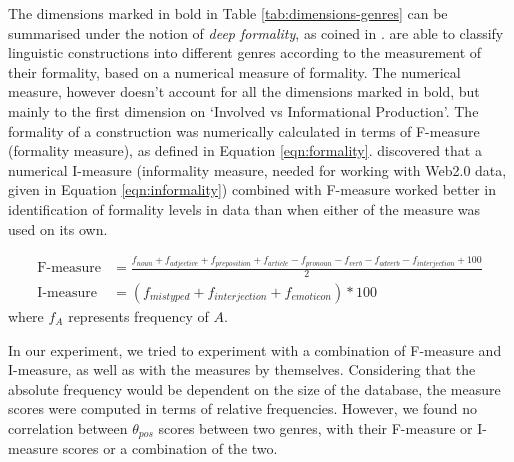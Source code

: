 The dimensions marked in bold in Table \ref{tab:dimensions-genres} can be summarised under the notion of \textit{deep formality}, as coined in \cite{formality1}. \citeauthor{formality1} are able to classify linguistic constructions into different genres according to the measurement of their formality, based on a numerical measure of formality. The numerical measure, however doesn't account for all the dimensions marked in bold, but mainly to the first dimension on `Involved vs Informational Production'. The formality of a construction was numerically calculated in terms of F-measure (formality measure), as defined in Equation \ref{eqn:formality}. \cite{formality2} discovered that a numerical I-measure (informality measure, needed for working with Web2.0 data, given in Equation \ref{eqn:informality}) combined with F-measure worked better in identification of formality levels in data than when either of the measure was used on its own.

\begin{align}
    \text{F-measure} &= \textstyle{\frac{f_{noun} + f_{adjective} + f_{preposition} + f_{article} - f_{pronoun} - f_{verb} - f_{adverb} - f_{interjection} + 100}{2}} \label{eqn:formality}\\
    \text{I-measure} &= (f_{mistyped} + f_{interjection} + f_{emoticon}) * 100 \label{eqn:informality}
\end{align}
where $f_{A}$ represents frequency of $A$.

In our experiment, we tried to experiment with a combination of F-measure and I-measure, as well as with the measures by themselves. Considering that the absolute frequency would be dependent on the size of the database, the measure scores were computed in terms of relative frequencies. However, we found no correlation between $\theta_{pos}$ scores between two genres, with their F-measure or I-measure scores or a combination of the two.